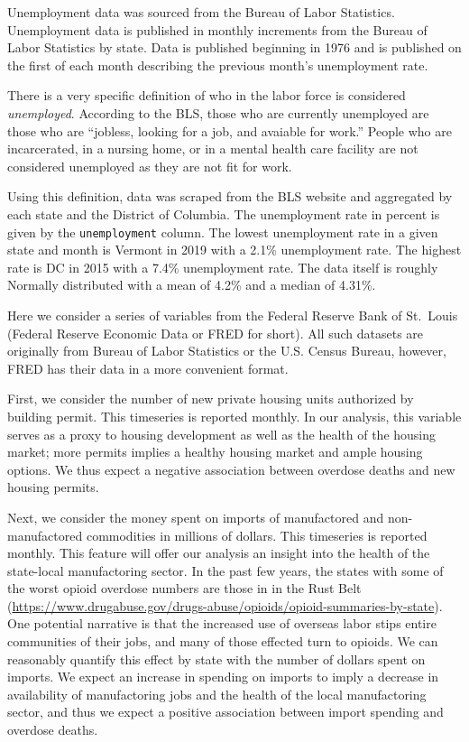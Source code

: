 \documentclass[]{article}
\begin{document}
Unemployment data was sourced from the Bureau of Labor Statistics.
Unemployment data is published in monthly increments from the Bureau of
Labor Statistics by state. Data is published beginning in 1976 and is
published on the first of each month describing the previous month's
unemployment rate.

There is a very specific definition of who in the labor force is
considered \emph{unemployed}. According to the BLS, those who are
currently unemployed are those who are ``jobless, looking for a job, and
avaiable for work.'' People who are incarcerated, in a nursing home, or
in a mental health care facility are not considered unemployed as they
are not fit for work.

Using this definition, data was scraped from the BLS website and
aggregated by each state and the District of Columbia. The unemployment
rate in percent is given by the \texttt{unemployment} column. The lowest
unemployment rate in a given state and month is Vermont in 2019 with a
2.1\% unemployment rate. The highest rate is DC in 2015 with a 7.4\%
unemployment rate. The data itself is roughly Normally distributed with
a mean of 4.2\% and a median of 4.31\%.

Here we consider a series of variables from the Federal Reserve Bank of
St.~Louis (Federal Reserve Economic Data or FRED for short). All such
datasets are originally from Bureau of Labor Statistics or the U.S.
Census Bureau, however, FRED has their data in a more convenient format.

First, we consider the number of new private housing units authorized by
building permit. This timeseries is reported monthly. In our analysis,
this variable serves as a proxy to housing development as well as the
health of the housing market; more permits implies a healthy housing
market and ample housing options. We thus expect a negative association
between overdose deaths and new housing permits.

Next, we consider the money spent on imports of manufactored and
non-manufactored commodities in millions of dollars. This timeseries is
reported monthly. This feature will offer our analysis an insight into
the health of the state-local manufactoring sector. In the past few
years, the states with some of the worst opioid overdose numbers are
those in in the Rust Belt
(\url{https://www.drugabuse.gov/drugs-abuse/opioids/opioid-summaries-by-state}).
One potential narrative is that the increased use of overseas labor
stips entire communities of their jobs, and many of those effected turn
to opioids. We can reasonably quantify this effect by state with the
number of dollars spent on imports. We expect an increase in spending on
imports to imply a decrease in availability of manufactoring jobs and
the health of the local manufactoring sector, and thus we expect a
positive association between import spending and overdose deaths.
\end{document}
